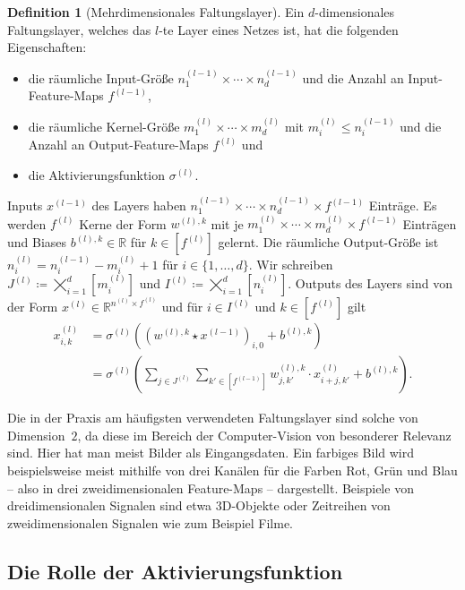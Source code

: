 \documentclass[paper=a4, 	%
		fontsize=11pt, 		%
		abstracton, 	%
		headsepline, 	%
		notitlepage	%
		]{scrartcl}
\theoremstyle{definition}
\newtheorem{definition}[theorem]{Definition}
\newcommand{\R}{\mathbb{R}}
\newcommand{\fNat}[1]{[ #1 ]}
\begin{document}
\begin{definition}[Mehrdimensionales Faltungslayer]\label{def:multi-dimensional-conv-layer}
    Ein $d$-dimensionales Faltungslayer, welches das $l$-te Layer eines Netzes ist, hat die folgenden Eigenschaften:
    \begin{itemize}
        \item die räumliche Input-Größe $n^{(l-1)}_1\times\cdots\times n^{(l-1)}_d$ und die Anzahl an Input-Feature-Maps $f^{(l-1)}$,
        \item die räumliche Kernel-Größe $m^{(l)}_1\times \cdots \times m^{(l)}_d$ mit $m^{(l)}_i \leq n^{(l-1)}_i$ und die Anzahl an Output-Feature-Maps $f^{(l)}$ und
        \item die Aktivierungsfunktion $\sigma^{(l)}$.
    \end{itemize}
    Inputs $x^{(l-1)}$ des Layers haben $n^{(l-1)}_1\times\cdots\times n^{(l-1)}_d \times f^{(l-1)}$ Einträge.
    Es werden $f^{(l)}$ Kerne der Form $w^{(l),k}$ mit je $m^{(l)}_1\times\cdots\times m^{(l)}_d \times f^{(l-1)}$ Einträgen und Biases $b^{(l),k}\in\R$ für  $k\in \fNat{f^{(l)}}$ gelernt.
    Die räumliche Output-Größe ist $n^{(l)}_i = n^{(l-1)}_i-  m^{(l)}_i + 1$ für $i\in\{1,\dots, d\}$.
    Wir schreiben $J^{(l)} \coloneqq \bigtimes_{i=1}^d [m^{(l)}_i]$ und $I^{(l)} \coloneqq \bigtimes_{i=1}^d [n^{(l)}_i]$.
    Outputs des Layers sind von der Form $x^{(l)}\in \R^{n^{(l)}\times f^{(l)}}$ und für $i\in I^{(l)}$ und $k\in\fNat{f^{(l)}}$ gilt
    \begin{align*}
        x^{(l)}_{i,k}
        &=  \sigma^{(l)}\left( (w^{(l),k} \star x^{(l-1)})_{i,0} + b^{(l),k} \right)\\
        &= \sigma^{(l)} \left( 
            \sum_{j \in J^{(l)}} \sum_{k'\in \fNat{f^{(l-1)}}}
            w^{(l),k}_{j,k'} \cdot x^{(l)}_{i+j, k'} + b^{(l), k}
        \right).
    \end{align*}
\end{definition}

Die in der Praxis am häufigsten verwendeten Faltungslayer sind solche von Dimension~$2$, da diese im Bereich der Computer-Vision von besonderer Relevanz sind.
Hier hat man meist Bilder als Eingangsdaten.
Ein farbiges Bild wird beispielsweise meist mithilfe von drei Kanälen für die Farben Rot, Grün und Blau -- also in drei zweidimensionalen Feature-Maps -- dargestellt.
Beispiele von dreidimensionalen Signalen sind etwa 3D-Objekte oder Zeitreihen von zweidimensionalen Signalen wie zum Beispiel Filme.

\subsection{Die Rolle der Aktivierungsfunktion}
\end{document}
